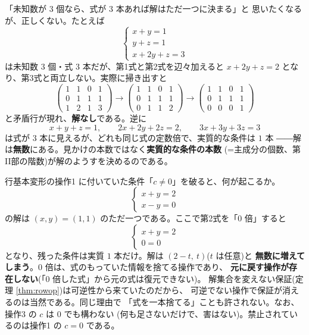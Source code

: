 \begin{hanrei}[式の本数では解の個数は決まらない]\label{hanrei:eqcount}
「未知数が $3$ 個なら、式が $3$ 本あれば解はただ一つに決まる」と
思いたくなるが、正しくない。たとえば
\[
\begin{cases}
x + y = 1 \\
y + z = 1 \\
x + 2y + z = 3
\end{cases}
\]
は未知数 $3$ 個・式 $3$ 本だが、第1式と第2式を辺々加えると
$x + 2y + z = 2$ となり、第3式と両立しない。実際に掃き出すと
\[
\left(\begin{array}{ccc|c}
1 & 1 & 0 & 1 \\
0 & 1 & 1 & 1 \\
1 & 2 & 1 & 3
\end{array}\right)
\longrightarrow
\left(\begin{array}{ccc|c}
1 & 1 & 0 & 1 \\
0 & 1 & 1 & 1 \\
0 & 1 & 1 & 2
\end{array}\right)
\longrightarrow
\left(\begin{array}{ccc|c}
1 & 1 & 0 & 1 \\
0 & 1 & 1 & 1 \\
0 & 0 & 0 & 1
\end{array}\right)
\]
と矛盾行が現れ、\textbf{解なし}である。逆に
\[
x + y + z = 1, \qquad 2x + 2y + 2z = 2, \qquad 3x + 3y + 3z = 3
\]
は式が $3$ 本に見えるが、どれも同じ式の定数倍で、実質的な条件は $1$ 本
――解は\textbf{無数}にある。見かけの本数ではなく\textbf{実質的な条件の本数}
(=主成分の個数、第II部の階数)が解のようすを決めるのである。
\end{hanrei}

\begin{hanrei}[$0$ 倍は許されない]\label{hanrei:rowzero}
行基本変形の操作1 に付いていた条件「$c \neq 0$」を破ると、何が起こるか。
\[
\begin{cases}
x + y = 2 \\
x - y = 0
\end{cases}
\]
の解は $(x, y) = (1, 1)$ のただ一つである。ここで第2式を「$0$ 倍」すると
\[
\begin{cases}
x + y = 2 \\
0 = 0
\end{cases}
\]
となり、残った条件は実質 $1$ 本だけ。解は $(2 - t,\ t)$($t$ は任意)と
\textbf{無数に増えてしまう}。$0$ 倍は、式のもっていた情報を捨てる操作であり、
\textbf{元に戻す操作が存在しない}(「$0$ 倍した式」から元の式は復元できない)。
解集合を変えない保証(定理 \ref{thm:rowop})は可逆性から来ていたのだから、
可逆でない操作で保証が消えるのは当然である。同じ理由で
「式を一本捨てる」ことも許されない。なお、操作3 の $c$ は $0$ でも構わない
(何も足さないだけで、害はない)。禁止されているのは操作1 の $c = 0$ である。
\end{hanrei}

